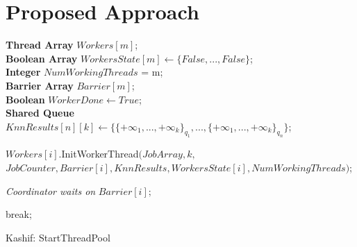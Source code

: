\section{Proposed Approach}
\label{sec:system-architecture}

\iffalse
\small
\begin{algorithm}
	\DontPrintSemicolon
	\caption{{\sc BuildIndex}}
	\label{algo:build_index}
\end{algorithm}

\small
\fi




\small
\begin{algorithm}
	\DontPrintSemicolon %
	
	\vspace{.2cm}
	\textbf{Thread Array} $Workers[m]$;\\
	\textbf{Boolean Array} $WorkersState[m] \gets \{False, ..., False\}$;\\
	\textbf{Integer} $NumWorkingThreads$ = m;\\
	\textbf{Barrier Array} $Barrier[m]$; \\
	\textbf{Boolean} $WorkerDone \gets True$;\\
	\textbf{Shared Queue} $KnnResults[n][k] \gets \{\{+\infty_{1}, ..., +\infty_{k}\}_{q_{1}}, ..., \{+\infty_{1}, ..., +\infty_{k}\}_{q_{n}}\}$;\\
	\vspace{.2cm}
	
	{
		$Workers[i].${\sc InitWorkerThread}$(JobArray, k, $\\ $JobCounter, Barrier[i], KnnResults, WorkersState[i], NumWorkingThreads)$;\\
	}
	
	{
		{
			{
				{\it Coordinator waits on} $Barrier[i];$\\
			}
			
		}

		{
			break;\\
		}
	
	}
	
	\caption{{\sc Kashif: StartThreadPool}}
	\label{algo:coordinator}
\end{algorithm}

